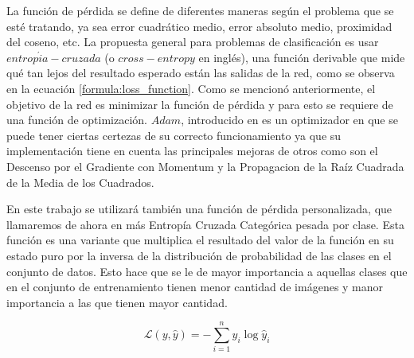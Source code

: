   La función de pérdida se define de diferentes maneras según el problema que se esté tratando, ya sea error cuadrático medio, error absoluto medio, proximidad del coseno, etc. La propuesta general para problemas de clasificación es usar \(entrop{\acute i}a-cruzada\) (o \(cross-entropy\) en inglés), una función derivable que mide qué tan lejos del resultado esperado están las salidas de la red, como se observa en la ecuación \ref{formula:loss_function}. Como se mencionó anteriormente, el objetivo de la red es minimizar la función de pérdida y para esto se requiere de una función de optimización. \(Adam\), introducido en \cite{kingma2014adam} es un optimizador en que se puede tener ciertas certezas de su correcto funcionamiento ya que su implementación tiene en cuenta las principales mejoras de otros como son el Descenso por el Gradiente con Momentum y la Propagacion de la Raíz Cuadrada de la Media de los Cuadrados.
  
  En este trabajo se utilizará también una función de pérdida personalizada, que llamaremos de ahora en más Entropía Cruzada Categórica pesada por clase. Esta función es una variante que multiplica el resultado del valor de la función en su estado puro por la inversa de la distribución de probabilidad de las clases en el conjunto de datos. Esto hace que se le de mayor importancia a aquellas clases que en el conjunto de entrenamiento tienen menor cantidad de imágenes y manor importancia a las que tienen mayor cantidad.
  
  \begin{equation}\label{formula:custom_loss_function}
  \mathcal{L}(y, \hat{y})=-\sum_{i=1}^{n} y_{i} \log \hat{y}_{i}
  \end{equation}
  
